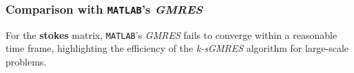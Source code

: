\begin{frame}
    \frametitle{Comparison with \lstinline{MATLAB}'s \textit{GMRES}}

    For the \textbf{stokes} matrix, \lstinline{MATLAB}'s \textit{GMRES} fails to converge within a reasonable time frame, highlighting the efficiency of the \textit{k-sGMRES} algorithm for large-scale problems.
\end{frame}